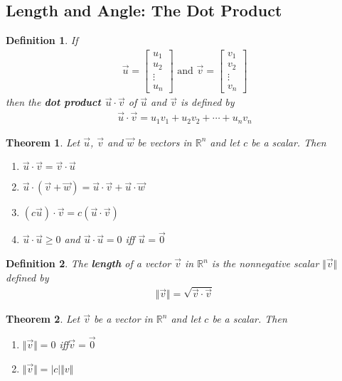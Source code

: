 \documentclass{article}
\theoremstyle{sltheorem}
\newtheorem{definition}{Definition}[section]
\newtheorem{theorem}{Theorem}[section]
\begin{document}
\subsection{Length and Angle: The Dot Product}
\begin{definition}
    If
    \begin{gather*}
        \vec u = \begin{bmatrix}
            u_1\\u_2\\\vdots\\u_n
        \end{bmatrix} \text{  and  }
        \vec v = \begin{bmatrix}
            v_1\\v_2\\\vdots\\v_n
        \end{bmatrix}
    \end{gather*}
    then the \textbf{dot product $\vec u \cdot \vec v$} of $\vec u$ and $\vec v$ is defined by
    \begin{gather*}
        \vec u \cdot \vec v = u_1v_1 + u_2v_2 + \cdots + u_nv_n
    \end{gather*} 
\end{definition}
\begin{theorem}
    Let $\vec u$, $\vec v$ and $\vec w$ be vectors in $\mathbb{R}^n$ and let $c$ be a scalar. Then
    \begin{enumerate}
        \item $\vec u \cdot \vec v = \vec v \cdot \vec u$
        \item $\vec u \cdot (\vec v + \vec w) = \vec u \cdot \vec v + \vec u \cdot \vec w$
        \item $(c\vec u) \cdot \vec v = c(\vec u \cdot \vec v)$
        \item $\vec u \cdot \vec u \geq 0$ and $\vec u \cdot \vec u = 0$ iff $\vec u = \vec 0$
    \end{enumerate}
\end{theorem}
\begin{definition}
    The \textbf{length} of a vector $\vec v$ in $\mathbb{R}^n$ is the nonnegative scalar $\Vert\vec v\Vert$ defined by
    \begin{gather*}
        \Vert\vec v\Vert = \sqrt{\vec v \cdot \vec v}
    \end{gather*}
\end{definition}
\begin{theorem}
    Let $\vec v$ be a vector in $\mathbb{R}^n$ and let $c$ be a scalar. Then
    \begin{enumerate}
        \item $\Vert\vec v\Vert = 0$ iff$\vec v = \vec 0$
        \item $\Vert\vec v\Vert = |c|\Vert v\Vert$
    \end{enumerate}
\end{theorem}
\end{document}
